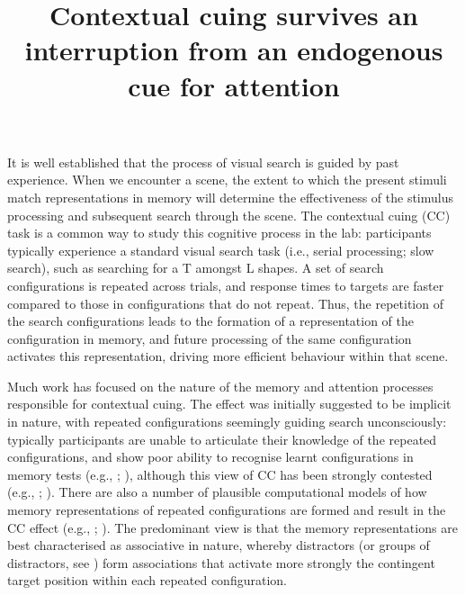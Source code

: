 \documentclass[
  man,
  floatsintext,
  longtable,
  nolmodern,
  notxfonts,
  notimes,
  colorlinks=true,linkcolor=blue,citecolor=blue,urlcolor=blue]{apa7}
\title{Contextual cuing survives an interruption from an endogenous cue
for attention}
\begin{document}
\maketitle


\setcounter{secnumdepth}{-\maxdimen} %

\setlength\LTleft{0pt}

\resetlinenumber[1]

It is well established that the process of visual search is guided by
past experience. When we encounter a scene, the extent to which the
present stimuli match representations in memory will determine the
effectiveness of the stimulus processing and subsequent search through
the scene. The contextual cuing (CC) task is a common way to study this
cognitive process in the lab: participants typically experience a
standard visual search task (i.e., serial processing; slow search), such
as searching for a T amongst L shapes. A set of search configurations is
repeated across trials, and response times to targets are faster
compared to those in configurations that do not repeat. Thus, the
repetition of the search configurations leads to the formation of a
representation of the configuration in memory, and future processing of
the same configuration activates this representation, driving more
efficient behaviour within that scene.

Much work has focused on the nature of the memory and attention
processes responsible for contextual cuing. The effect was initially
suggested to be implicit in nature, with repeated configurations
seemingly guiding search unconsciously: typically participants are
unable to articulate their knowledge of the repeated configurations, and
show poor ability to recognise learnt configurations in memory tests
(e.g., ;
), although this
view of CC has been strongly contested (e.g.,
;
). There are also a
number of plausible computational models of how memory representations
of repeated configurations are formed and result in the CC effect (e.g.,
;
). The predominant view is
that the memory representations are best characterised as associative in
nature, whereby distractors (or groups of distractors, see
) form associations that
activate more strongly the contingent target position within each
repeated configuration.
\end{document}
